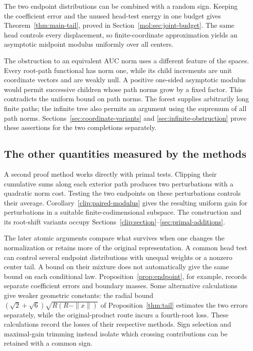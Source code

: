The two endpoint distributions can be combined with a random sign.
Keeping the coefficient error and the unused head-test energy in one
budget gives Theorem~\ref{thm:main-tail}, proved in
Section~\ref{mol:sec:joint-budget}. The same head controls every
displacement, so finite-coordinate approximation yields an asymptotic
midpoint modulus uniformly over all centers.

The obstruction to an equivalent AUC norm uses a different feature of
the spaces. Every root-path functional has norm one, while its child
increments are unit coordinate vectors and are weakly null. A positive
one-sided asymptotic modulus would permit successive children whose
path norms grow by a fixed factor. This contradicts the uniform bound
on path norms. The forest supplies arbitrarily long finite paths;
the infinite tree also permits an argument using the supremum of all
path norms. Sections~\ref{sec:coordinate-variants} and
\ref{sec:infinite-obstruction} prove these assertions for the two
completions separately.


\subsection{The other quantities measured by the methods}

A second proof method works directly with primal tests. Clipping their
cumulative sums along each exterior path produces two perturbations
with a quadratic norm cost. Testing the two endpoints on these
perturbations controls their average. Corollary~\ref{clip:paired-modulus}
gives the resulting uniform gain for perturbations in a suitable
finite-codimensional subspace. The construction and its root-shift
variants occupy Sections~\ref{clip:section}--\ref{sec:primal-additions}.

The later atomic arguments compare what survives when one changes the
normalization or retains more of the original representation. A common
head test can control several endpoint distributions with unequal
weights or a nonzero center tail. A bound on their mixture does not
automatically give the same bound on each conditional law.
Proposition~\ref{prop:endpoint}, for example, records separate
coefficient errors and boundary masses. Some alternative calculations
give weaker geometric constants: the radial bound
$(\sqrt2+\sqrt6)\sqrt{R(R-\|x\|)}$ of Proposition~\ref{thm:tail}
estimates the two errors separately, while the original-product route
incurs a fourth-root loss. These calculations record the losses of
their respective methods. Sign selection and
maximal-gain trimming instead isolate which crossing contributions
can be retained with a common sign.

